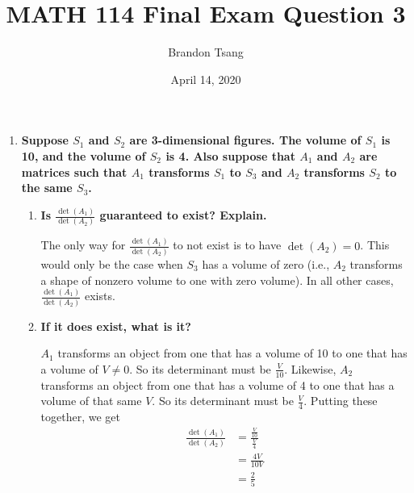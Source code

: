 \documentclass[11pt]{article}
\title{MATH 114 Final Exam Question 3}
\author{Brandon Tsang}
\date{April 14, 2020}
\begin{document}
    \maketitle
    \begin{enumerate}[label=\textbf{\arabic*.}, start=3]
        \item{
            \textbf{\boldmath Suppose \(S_1\) and \(S_2\) are 3-dimensional figures. The volume of \(S_1\) is 10, and the volume of \(S_2\) is 4. Also suppose that \(A_1\) and \(A_2\) are matrices such that \(A_1\) transforms \(S_1\) to \(S_3\) and \(A_2\) transforms \(S_2\) to the same \(S_3\).}
            \begin{enumerate}[label=\textbf{(\alph*)}]
                \item{
                    \textbf{\boldmath Is \(\frac{\det(A_1)}{\det(A_2)}\) guaranteed to exist? Explain.}
                    \par
                    The only way for \(\frac{\det(A_1)}{\det(A_2)}\) to not exist is to have \(\det(A_2)=0\). This would only be the case when \(S_3\) has a volume of zero (i.e., \(A_2\) transforms a shape of nonzero volume to one with zero volume). In all other cases, \(\frac{\det(A_1)}{\det(A_2)}\) exists.
                }
                \item{
                    \textbf{If it does exist, what is it?}
                    \par
                    \(A_1\) transforms an object from one that has a volume of 10 to one that has a volume of \(V\neq0\). So its determinant must be \(\frac{V}{10}\). Likewise, \(A_2\) transforms an object from one that has a volume of 4 to one that has a volume of that same \(V\). So its determinant must be \(\frac{V}{4}\). Putting these together, we get
                    \begin{align*}
                        \frac{\det(A_1)}{\det(A_2)}&=\frac{\frac{V}{10}}{\frac{V}{4}} \\
                        &=\frac{4V}{10V} \\
                        &=\frac{2}{5}
                    \end{align*}
                }
            \end{enumerate}
        }
    \end{enumerate}
\end{document}
